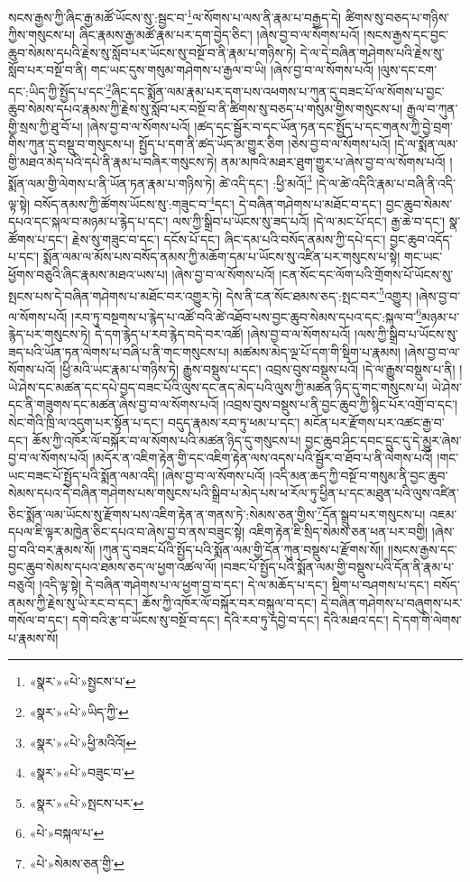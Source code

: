 སངས་རྒྱས་ཀྱི་ཞིང་རྒྱ་མཚོ་ཡོངས་སུ་:སྦྱང་བ་\footnote{«སྣར་»«པེ་»སྤྱངས་པ་}ལ་སོགས་པ་ལས་ནི་རྣམ་པ་བརྒྱད་དེ། ཚིགས་སུ་བཅད་པ་གཉིས་ཀྱིས་གསུངས་པ། ཞིང་རྣམས་རྒྱ་མཚོ་རྣམ་པར་དག་བྱེད་ཅིང་། །ཞེས་བྱ་བ་ལ་སོགས་པའོ། །སངས་རྒྱས་དང་བྱང་ཆུབ་སེམས་དཔའི་རྗེས་སུ་སློབ་པར་ཡོངས་སུ་བསྔོ་བ་ནི་རྣམ་པ་གཉིས་ཏེ། དེ་ལ་དེ་བཞིན་གཤེགས་པའི་རྗེས་སུ་སློབ་པར་བསྔོ་བ་ནི། གང་ཡང་དུས་གསུམ་གཤེགས་པ་རྒྱལ་བ་ཡི། །ཞེས་བྱ་བ་ལ་སོགས་པའོ། །ལུས་དང་ངག་དང་:ཡིད་ཀྱི་སྤྱོད་པ་དང་\footnote{«སྣར་»«པེ་»ཡིད་ཀྱི་}ཞིང་དང་སྨོན་ལམ་རྣམ་པར་དག་པས་འཕགས་པ་ཀུན་དུ་བཟང་པོ་ལ་སོགས་པ་བྱང་ཆུབ་སེམས་དཔའ་རྣམས་ཀྱི་རྗེས་སུ་སློབ་པར་བསྔོ་བ་ནི་ཚིགས་སུ་བཅད་པ་གསུམ་གྱིས་གསུངས་པ། རྒྱལ་བ་ཀུན་གྱི་སྲས་ཀྱི་ཐུ་བོ་པ། །ཞེས་བྱ་བ་ལ་སོགས་པའོ། །ཚད་དང་སྦྱོར་བ་དང་ཡོན་ཏན་དང་སྤྱོད་པ་དང་གནས་ཀྱི་བྱེ་བྲག་གིས་ཀུན་དུ་བསྡུ་བ་གསུངས་པ། སྤྱོད་པ་དག་ནི་ཚད་ཡོད་མ་གྱུར་ཅིག །ཅེས་བྱ་བ་ལ་སོགས་པའོ། །དེ་ལ་སྨོན་ལམ་གྱི་མཐའ་མེད་པའི་དཔེ་ནི་རྣམ་པ་བཞིར་གསུངས་ཏེ། ནམ་མཁའི་མཐར་ཐུག་གྱུར་པ་ཞེས་བྱ་བ་ལ་སོགས་པའོ། །སྨོན་ལམ་གྱི་ལེགས་པ་ནི་ཡོན་ཏན་རྣམ་པ་གཉིས་ཏེ། ཚེ་འདི་དང་། :ཕྱི་མའོ།\footnote{«སྣར་»«པེ་»ཕྱི་མའིའོ།} །དེ་ལ་ཚེ་འདིའི་རྣམ་པ་བཞི་ནི་འདི་ལྟ་སྟེ། བསོད་ནམས་ཀྱི་ཚོགས་ཡོངས་སུ་:གཟུང་བ་\footnote{«སྣར་»«པེ་»བཟུང་བ་}དང་། དེ་བཞིན་གཤེགས་པ་མཐོང་བ་དང་། བྱང་ཆུབ་སེམས་དཔའ་དང་སྐལ་བ་མཉམ་པ་རྙེད་པ་དང་། ལས་ཀྱི་སྒྲིབ་པ་ཡོངས་སུ་ཟད་པའོ། །དེ་ལ་མང་པོ་དང་། རྒྱ་ཆེ་བ་དང་། སྣ་ཚོགས་པ་དང་། རྗེས་སུ་གཟུང་བ་དང་། དངོས་པོ་དང་། ཞིང་དམ་པའི་བསོད་ནམས་ཀྱི་དཔེ་དང་། བྱང་ཆུབ་འདོད་པ་དང་། སྨོན་ལམ་ལ་མོས་པས་བསོད་ནམས་ཀྱི་མཆོག་དམ་པ་ཡོངས་སུ་འཛིན་པར་གསུངས་པ་སྟེ། གང་ཡང་ཕྱོགས་བཅུའི་ཞིང་རྣམས་མཐའ་ཡས་པ། །ཞེས་བྱ་བ་ལ་སོགས་པའོ། །ངན་སོང་དང་ལོག་པའི་གྲོགས་པོ་ཡོངས་སུ་སྤངས་པས་དེ་བཞིན་གཤེགས་པ་མཐོང་བར་འགྱུར་ཏེ། དེས་ནི་ངན་སོང་ཐམས་ཅད་:སྤང་བར་\footnote{«སྣར་»«པེ་»སྤངས་པར་}འགྱུར། །ཞེས་བྱ་བ་ལ་སོགས་པའོ། །རབ་ཏུ་བསྔགས་པ་རྙེད་པ་འཚོ་བའི་ཚེ་འཐོབ་པས་བྱང་ཆུབ་སེམས་དཔའ་དང་:སྐལ་བ་\footnote{«པེ་»བསྐལ་པ་}མཉམ་པ་རྙེད་པར་གསུངས་ཏེ། དེ་དག་རྙེད་པ་རབ་རྙེད་བདེ་བར་འཚོ། །ཞེས་བྱ་བ་ལ་སོགས་པའོ། །ལས་ཀྱི་སྒྲིབ་པ་ཡོངས་སུ་ཟད་པའི་ཡོན་ཏན་ལེགས་པ་བཞི་པ་ནི་གང་གསུངས་པ། མཚམས་མེད་ལྔ་པོ་དག་གི་སྡིག་པ་རྣམས། །ཞེས་བྱ་བ་ལ་སོགས་པའོ། །ཕྱི་མའི་ཡང་རྣམ་པ་གཉིས་ཏེ། རྒྱུས་བསྡུས་པ་དང་། འབྲས་བུས་བསྡུས་པའོ། །དེ་ལ་རྒྱུས་བསྡུས་པ་ནི། །ཡེ་ཤེས་དང་མཚན་དང་དཔེ་བྱད་བཟང་པོའི་ལུས་དང་ནད་མེད་པའི་ལུས་ཀྱི་མཚན་ཉིད་དུ་གང་གསུངས་པ། ཡེ་ཤེས་དང་ནི་གཟུགས་དང་མཚན་ཞེས་བྱ་བ་ལ་སོགས་པའོ། །འབྲས་བུས་བསྡུས་པ་ནི་བྱང་ཆུབ་ཀྱི་སྙིང་པོར་འགྲོ་བ་དང་། སེང་གེའི་ཁྲི་ལ་འདུག་པར་སྟོན་པ་དང་། བདུད་རྣམས་རབ་ཏུ་ཕམ་པ་དང་། མངོན་པར་རྫོགས་པར་འཚང་རྒྱ་བ་དང་། ཆོས་ཀྱི་འཁོར་ལོ་བསྐོར་བ་ལ་སོགས་པའི་མཚན་ཉིད་དུ་གསུངས་པ། བྱང་ཆུབ་ཤིང་དབང་དྲུང་དུ་དེ་མྱུར་ཞེས་བྱ་བ་ལ་སོགས་པའོ། །མདོར་ན་འཇིག་རྟེན་གྱི་དང་འཇིག་རྟེན་ལས་འདས་པའི་སྦྱོར་བ་ཐོབ་པ་ནི་ལེགས་པའོ། །གང་ཡང་བཟང་པོ་སྤྱོད་པའི་སྨོན་ལམ་འདི། །ཞེས་བྱ་བ་ལ་སོགས་པའོ། །འདི་མན་ཆད་ཀྱི་བསྔོ་བ་གསུམ་ནི་བྱང་ཆུབ་སེམས་དཔའ་དེ་བཞིན་གཤེགས་པས་གསུངས་པའི་སྒྲིབ་པ་མེད་པས་ཕ་རོལ་ཏུ་ཕྱིན་པ་དང་མཐུན་པའི་ལུས་འཛིན་ཅིང་སྨོན་ལམ་ཡོངས་སུ་རྫོགས་པས་འཇིག་རྟེན་ན་གནས་ཏེ་:སེམས་ཅན་གྱིས་\footnote{«པེ་»སེམས་ཅན་གྱི་}དོན་སྒྲུབ་པར་གསུངས་པ། འཇམ་དཔལ་ཇི་ལྟར་མཁྱེན་ཅིང་དཔའ་བ་ཞེས་བྱ་བ་ནས་བཟུང་སྟེ། འཇིག་རྟེན་ཇི་སྲིད་སེམས་ཅན་ཕན་པར་བགྱི། །ཞེས་བྱ་བའི་བར་རྣམས་སོ། །ཀུན་དུ་བཟང་པོའི་སྤྱོད་པའི་སྨོན་ལམ་གྱི་དོན་ཀུན་བསྡུས་པ་རྫོགས་སོ།། །།སངས་རྒྱས་དང་བྱང་ཆུབ་སེམས་དཔའ་ཐམས་ཅད་ལ་ཕྱག་འཚལ་ལོ། །བཟང་པོ་སྤྱོད་པའི་སྨོན་ལམ་གྱི་བསྡུས་པའི་དོན་ནི་རྣམ་པ་བཅུའོ། །འདི་ལྟ་སྟེ། དེ་བཞིན་གཤེགས་པ་ལ་ཕྱག་བྱ་བ་དང་། དེ་ལ་མཆོད་པ་དང་། སྡིག་པ་བཤགས་པ་དང་། བསོད་ནམས་ཀྱི་རྗེས་སུ་ཡི་རང་བ་དང་། ཆོས་ཀྱི་འཁོར་ལོ་བསྐོར་བར་བསྐུལ་བ་དང་། དེ་བཞིན་གཤེགས་པ་བཞུགས་པར་གསོལ་བ་དང་། དགེ་བའི་རྩ་བ་ཡོངས་སུ་བསྔོ་བ་དང་། དེའི་རབ་ཏུ་དབྱེ་བ་དང་། དེའི་མཐའ་དང་། དེ་དག་གི་ལེགས་པ་རྣམས་སོ། 